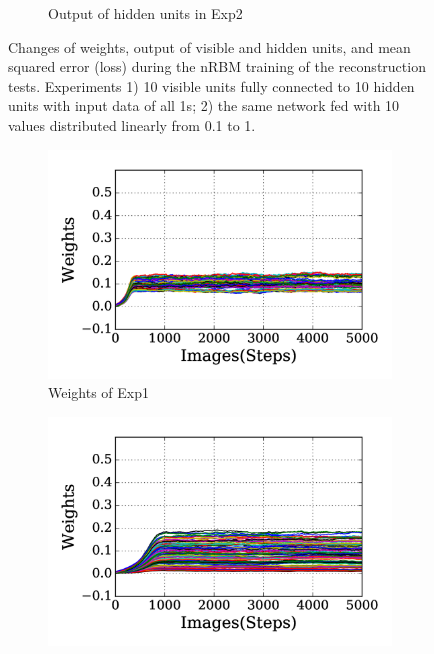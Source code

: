 \begin{figure}
\begin{subfigure}[t]{0.48\textwidth}
		\caption{Output of hidden units in Exp2}
	\end{subfigure}
	\caption[nRBM training of the reconstruction tests.]{Changes of weights, output of visible and hidden units, and mean squared error (loss) during the nRBM training of the reconstruction tests. 
		Experiments 1) 10 visible units fully connected to 10 hidden units with input data of all 1s; 2) the same network fed with 10 values distributed linearly from 0.1 to 1.}
	\label{fig:rbm_orig}
\end{figure}

\begin{figure}
	\centering
	\begin{subfigure}[t]{0.48\textwidth}
		\includegraphics[width=\textwidth]{pics_sdlm/31_exp_RBM_noise/exp1_weights_s.png}
		\caption{Weights of Exp1}
	\end{subfigure}
	\begin{subfigure}[t]{0.48\textwidth}
		\includegraphics[width=\textwidth]{pics_sdlm/31_exp_RBM_noise/exp2_weights_s.png}

\end{subfigure}
\end{figure}
